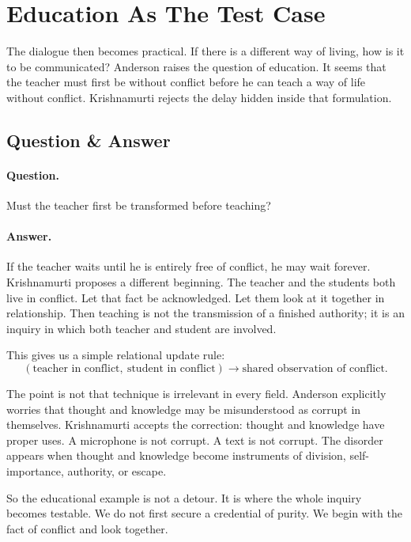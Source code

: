 \section{Education As The Test Case}

The dialogue then becomes practical. If there is a different way of living, how is it to be communicated? Anderson raises the question of education. It seems that the teacher must first be without conflict before he can teach a way of life without conflict. Krishnamurti rejects the delay hidden inside that formulation.

\subsection{Question \& Answer}

\paragraph{Question.}
Must the teacher first be transformed before teaching?

\paragraph{Answer.}
If the teacher waits until he is entirely free of conflict, he may wait forever. Krishnamurti proposes a different beginning. The teacher and the students both live in conflict. Let that fact be acknowledged. Let them look at it together in relationship. Then teaching is not the transmission of a finished authority; it is an inquiry in which both teacher and student are involved.

This gives us a simple relational update rule:
\begin{equation}
(\text{teacher in conflict},\ \text{student in conflict})
   \longrightarrow
\text{shared observation of conflict}.
\end{equation}

The point is not that technique is irrelevant in every field. Anderson explicitly worries that thought and knowledge may be misunderstood as corrupt in themselves. Krishnamurti accepts the correction: thought and knowledge have proper uses. A microphone is not corrupt. A text is not corrupt. The disorder appears when thought and knowledge become instruments of division, self-importance, authority, or escape.

So the educational example is not a detour. It is where the whole inquiry becomes testable. We do not first secure a credential of purity. We begin with the fact of conflict and look together.

